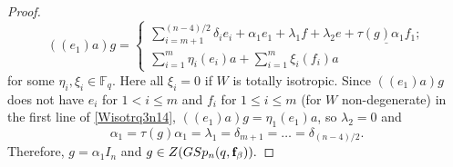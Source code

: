 \begin{proof}
\begin{equation}
((e_1)a)g=
\begin{cases}
\sum_{i=m+1}^{(n-4)/2}\delta_i e_i +\alpha_1e_1 + \lambda_1 f + \lambda_2 e + \underline{\tau(g) \alpha_1 f_1};\\
\sum_{i=1}^{m} \eta_i (e_i)a+ \sum_{i=1}^{m} \xi_i (f_i)a
\end{cases}
\end{equation}
for some $\eta_i, \xi_i \in \mathbb{F}_q.$ Here all $\xi_i=0$ if $W$ is totally isotropic.
Since $((e_1)a)g$ does not have $e_i$ for $1<i  \le m$ and $f_i$ for $1 \le i \le m$ (for $W$ non-degenerate) in the first line of \eqref{Wisotrq3n14}, $((e_1 )a)g = \eta_1 (e_1 )a$, so $\lambda_2=0$ and
$$\alpha_1=\tau(g)\alpha_1=\lambda_1=\delta_{m+1}= \ldots= \delta_{(n-4)/2}.$$
Therefore, $g=\alpha_1I_n$ and  $g \in Z(GSp_n(q, {\bf f}_{\beta})).$

\medskip


\end{proof}
